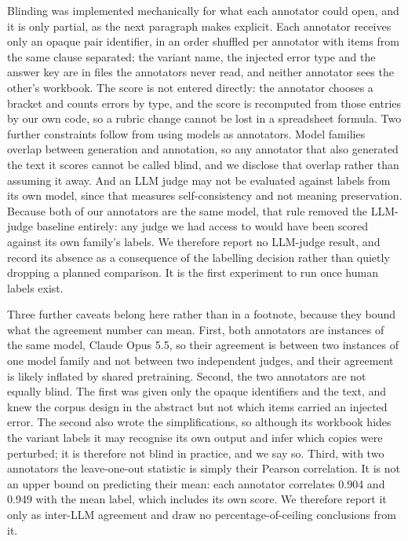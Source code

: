 \documentclass[conference]{IEEEtran}
\begin{document}
Blinding was implemented mechanically for what each annotator could open, and it is only partial, as the next paragraph makes explicit. Each annotator receives only an opaque pair identifier, in an order shuffled per annotator with items from the same clause separated; the variant name, the injected error type and the answer key are in files the annotators never read, and neither annotator sees the other's workbook. The score is not entered directly: the annotator chooses a bracket and counts errors by type, and the score is recomputed from those entries by our own code, so a rubric change cannot be lost in a spreadsheet formula. Two further constraints follow from using models as annotators. Model families overlap between generation and annotation, so any annotator that also generated the text it scores cannot be called blind, and we disclose that overlap rather than assuming it away. And an LLM judge may not be evaluated against labels from its own model, since that measures self-consistency and not meaning preservation. Because both of our annotators are the same model, that rule removed the LLM-judge baseline entirely: any judge we had access to would have been scored against its own family's labels. We therefore report no LLM-judge result, and record its absence as a consequence of the labelling decision rather than quietly dropping a planned comparison. It is the first experiment to run once human labels exist.

Three further caveats belong here rather than in a footnote, because they bound what the agreement number can mean. First, both annotators are instances of the same model, Claude Opus 5.5, so their agreement is between two instances of one model family and not between two independent judges, and their agreement is likely inflated by shared pretraining. Second, the two annotators are not equally blind. The first was given only the opaque identifiers and the text, and knew the corpus design in the abstract but not which items carried an injected error. The second also wrote the simplifications, so although its workbook hides the variant labels it may recognise its own output and infer which copies were perturbed; it is therefore not blind in practice, and we say so. Third, with two annotators the leave-one-out statistic is simply their Pearson correlation. It is not an upper bound on predicting their mean: each annotator correlates 0.904 and 0.949 with the mean label, which includes its own score. We therefore report it only as inter-LLM agreement and draw no percentage-of-ceiling conclusions from it.
\end{document}
